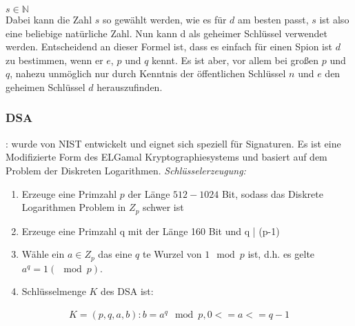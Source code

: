 $s \in \mathbb{N}$
\\
Dabei kann die Zahl $s$ so gewählt werden, wie es für $d$ am besten passt, $s$ ist also
eine beliebige natürliche Zahl. Nun kann d als geheimer Schlüssel verwendet
werden. Entscheidend an dieser Formel ist, dass es einfach für einen Spion ist $d$ zu
bestimmen, wenn er $e$, $p$ und $q$ kennt. Es ist aber, vor allem bei großen $p$ und $q$,
nahezu unmöglich nur durch Kenntnis der öffentlichen Schlüssel $n$ und $e$ den
geheimen Schlüssel $d$ herauszufinden.
\subsubsection{DSA}:
wurde von NIST entwickelt und eignet sich speziell für Signaturen. Es ist eine Modifizierte Form des ELGamal Kryptographiesystems und basiert auf dem Problem der Diskreten Logarithmen. 
\textit{Schlüsselerzeugung:} 
\begin{enumerate}
\item Erzeuge eine Primzahl $p$ der Länge $512-1024$ Bit, sodass das Diskrete
Logarithmen Problem in $Z_p$ schwer ist
\item Erzeuge eine Primzahl q mit der Länge 160 Bit und q | (p-1)
\item Wähle ein $a \in Z_p$ das eine $q$ te Wurzel von $1 \mod p$ ist, d.h. es gelte
$a^q = 1 (\mod p)$.
\item Schlüsselmenge $K$ des DSA ist:

\end{enumerate}
\begin{equation}
	\begin{split}
		K=(p,q,a,b) :b=a^q \mod p,     0<=a<=q-1
 	\end{split}
\end{equation}
	

